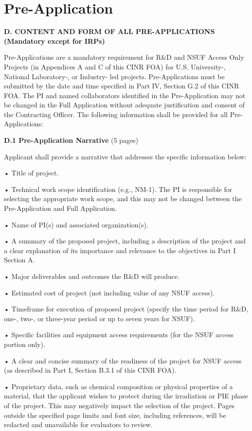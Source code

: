 \section{Pre-Application}


{\bf D. CONTENT AND FORM OF ALL PRE-APPLICATIONS (Mandatory except for IRPs)}

Pre-Applications are a mandatory requirement for R\&D and NSUF Access Only
Projects (in Appendices A and C of this CINR FOA) for U.S. University-,
National Laboratory-, or Industry- led projects. Pre-Applications must be
submitted by the date and time specified in Part IV, Section G.2 of this CINR
FOA.  The PI and named collaborators identified in the Pre-Application may not
be changed in the Full Application without adequate justification and consent
of the Contracting Officer.  The following information shall be provided for
all Pre-Applications:

{\bf D.1 Pre-Application Narrative} (5 pages)

Applicant shall provide a narrative that addresses the specific information below:

• Title of project.

• Technical work scope identification (e.g., NM-1). The PI is responsible for
selecting the appropriate work scope, and this may not be changed between the
Pre-Application and Full Application.

• Name of PI(s) and associated organization(s).

• A summary of the proposed project, including a description of the project and
a clear explanation of its importance and relevance to the objectives in Part I
Section A.

• Major deliverables and outcomes the R\&D will produce.

• Estimated cost of project (not including value of any NSUF access).

• Timeframe for execution of proposed project (specify the time period for R\&D,
one-, two-, or three-year period or up to seven years for NSUF).

• Specific facilities and equipment access requirements (for the NSUF access portion only).

• A clear and concise summary of the readiness of the project for NSUF access
(as described in Part I, Section B.3.1 of this CINR FOA).

• Proprietary data, such as chemical composition or physical properties of a
material, that the applicant wishes to protect during the irradiation or PIE
phase of the project. This may negatively impact the selection of the project.
Pages outside the specified page limits and font size, including references,
will be redacted and unavailable for evaluators to review.

